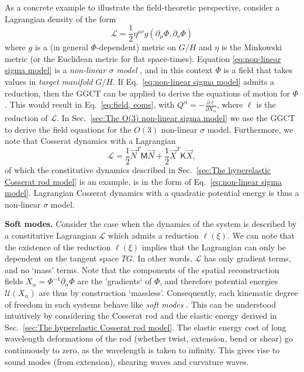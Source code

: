 As a concrete example to illustrate the field-theoretic perspective, consider a Lagrangian density of the form
\begin{equation} \label{eq:non-linear sigma model}
\mathcal{L} = \frac{1}{2}  \eta^{\mu \nu} g( \partial_\mu \Phi, \partial_\nu \Phi) 
\end{equation}
where $g$ is a (in general $\Phi$-dependent) metric on $G/H$ and $\eta$ is the Minkowski metric (or the Euclidean metric for flat space-times). Equation \ref{eq:non-linear sigma model} is a \textit{non-linear $\sigma$ model} \citep{ketovQuantumNonlinearSigmaModels2013, marchettiHydrodynamicsSoftActive2013}, and in this context $\Phi$ is a field that takes values in \textit{target manifold} $G/H$. If Eq.~\ref{eq:non-linear sigma model} admits a reduction, then the GGCT can be applied to derive the equations of motion for $\Phi$. This would result in Eq.~\ref{eq:field, eoms}, with $Q^\alpha = - \frac{\partial \ell}{\partial X_\alpha}$, where $\ell$ is the reduction of $\mathcal{L}$. In Sec.~\ref{sec:The O(3) non-linear sigma model} we use the GGCT to derive the field equations for the $O(3)$ non-linear $\sigma$ model. Furthermore, we note that Cosserat dynamics with a Lagrangian
\begin{equation}
\mathcal{L} = \frac{1}{2} \vec{N}^T \mathsf{M} \vec{N} + \frac{1}{2} \vec{X}^T \mathsf{K} \vec{X},
\end{equation}
of which the constitutive dynamics described in Sec.~\ref{sec:The hyperelastic Cosserat rod model} is an example, is in the form of Eq.~\ref{eq:non-linear sigma model}. Lagrangian Cosserat dynamics with a quadratic potential energy is thus a non-linear $\sigma$ model.

\textbf{Soft modes.} Consider the case when the dynamics of the system is described by a constitutive Lagrangian $\mathcal{L}$ which admits a reduction $\ell (\xi)$. We can note that the existence of the reduction $\ell (\xi)$ implies that the Lagrangian can only be dependent on the tangent space $TG$. In other words, $\mathcal{L}$ has only gradient terms, and no `mass' terms. Note that the components of the spatial reconstruction fields $X_\alpha = \Phi^{-1} \partial_\alpha \Phi$ are the 'gradients` of $\Phi$, and therefore potential energies $\mathcal{U}(X_\alpha)$ are thus by construction `massless'. Consequently, each kinematic degree of freedom in such systems behave like \textit{soft modes} \citep{sethnaOrderParametersBroken2021, chaikinPrinciplesCondensedMatter1995}. This can be understood intuitively by considering the Cosserat rod and the elastic energy derived in Sec.~\ref{sec:The hyperelastic Cosserat rod model}. The elastic energy cost of long wavelength deformations of the rod (whether twist, extension, bend or shear) go continuously to zero, as the wavelength is taken to infinity. This gives rise to sound modes (from extension), shearing waves and curvature waves.

